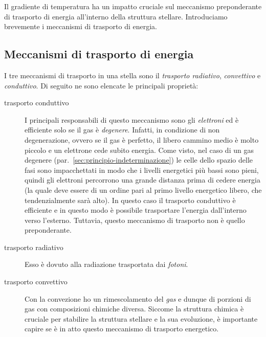 Il gradiente di temperatura ha un impatto cruciale sul meccanismo preponderante di trasporto di energia all'interno della struttura stellare. Introduciamo brevemente i meccanismi di trasporto di energia.

\subsection{Meccanismi di trasporto di energia}
I tre meccanismi di trasporto in una stella sono il \emph{trasporto radiativo}, \emph{convettivo} e \emph{conduttivo}. Di seguito ne sono elencate le principali proprietà:
\begin{description}
    \item[trasporto conduttivo] I principali responsabili di questo meccanismo sono gli \emph{elettroni} ed è efficiente solo se il gas è \emph{degenere}. Infatti, in condizione di non degenerazione, ovvero se il gas è perfetto, il libero cammino medio è molto piccolo e un elettrone cede subito energia. Come visto, nel caso di un gas degenere (par.~\ref{sec:principio-indeterminazione}) le celle dello spazio delle fasi sono impacchettati in modo che i livelli energetici più bassi sono pieni, quindi gli elettroni percorrono una grande distanza prima di cedere energia (la quale deve essere di un ordine pari al primo livello energetico libero, che tendenzialmente sarà alto). In questo caso il trasporto conduttivo è efficiente e in questo modo è possibile trasportare l'energia dall'interno verso l'esterno. Tuttavia, questo meccanismo di trasporto non è quello preponderante.
    \item[trasporto radiativo] Esso è dovuto alla radiazione trasportata dai \emph{fotoni}.
    \item[trasporto convettivo] Con la convezione ho un rimescolamento del \emph{gas} e dunque di porzioni di gas con composizioni chimiche diversa. Siccome la struttura chimica è cruciale per stabilire la struttura stellare e la sua evoluzione, è importante capire se è in atto questo meccanismo di trasporto energetico.
\end{description}

